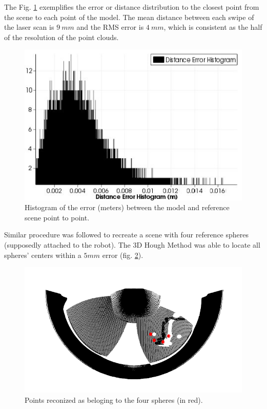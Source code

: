 The Fig. \ref{fig:histogram} exemplifies the error or distance distribution
to the closest point from the scene to each point of the model. The mean
distance between each swipe of the laser scan is $9~mm$ and the
RMS error is $4~mm$, which is consistent as the half of the resolution of the
point clouds.

\begin{figure}
	\centering
	\includegraphics[width=.95\columnwidth]{figs/results/histogram}
    \caption{Histogram of the error (meters) between the model and reference
    scene point to point.}
    \label{fig:histogram}
\end{figure}

Similar procedure was followed to recreate a scene with four reference spheres
(supposedly attached to the robot). The 3D Hough Method was able to locate all
spheres' centers within a $5mm$ error (fig. \ref{fig:sphere_hough}).

\begin{figure}
	\centering
	\includegraphics[width=.95\columnwidth]{figs/results/SphereHough}
    \caption{Points reconized as beloging to the four spheres (in red).}
    \label{fig:sphere_hough}
\end{figure}

